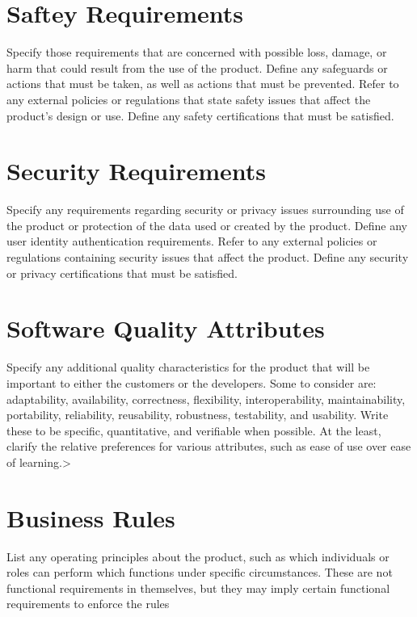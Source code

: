 \documentclass{scrreprt}
\begin{document}
    \section{Saftey Requirements}
    Specify those requirements that are concerned with possible loss, damage, or harm that could result from the use of the product. Define any safeguards or actions that must be taken, as well as actions that must be prevented. Refer to any external policies or regulations that state safety issues that affect the product’s design or use. Define any safety certifications that must be satisfied. 
    \section{Security Requirements}
    Specify any requirements regarding security or privacy issues surrounding use of the product or protection of the data used or created by the product. Define any user identity authentication requirements. Refer to any external policies or regulations containing security issues that affect the product. Define any security or privacy certifications that must be satisfied. 
    \section{Software Quality Attributes}
    Specify any additional quality characteristics for the product that will be important to either the customers or the developers. Some to consider are: adaptability, availability, correctness, flexibility, interoperability, maintainability, portability, reliability, reusability, robustness, testability, and usability. Write these to be specific, quantitative, and verifiable when possible. At the least, clarify the relative preferences for various attributes, such as ease of use over ease of learning.>  
    \section{Business Rules} 
    List any operating principles about the product, such as which individuals or roles can perform which functions under specific circumstances. These are not functional requirements in themselves, but they may imply certain functional requirements to enforce the rules
    
\end{document}

